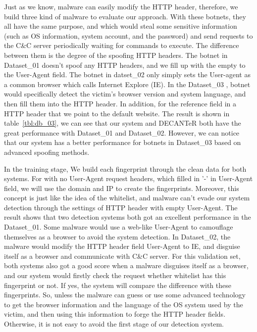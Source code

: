 Just as we know, malware can easily modify the HTTP header, therefore, we build three kind of malware to evaluate our approach. With these botnets, they all have the same purpose, and which would steal some sensitive information (such as OS information, system account, and the password) and send requests to the C\&C server periodically waiting for commands to execute. The difference between them is the degree of the spoofing HTTP headers. The botnet in Dataset\_01 doesn't spoof any HTTP headers, and we fill up with the empty to the User-Agent field. The botnet in datset\_02 only simply sets the User-agent as a common browser which calls Internet Explore (IE). In the Dataset\_03 , botnet would specifically detect the victim's browser version and system language, and then fill them into the HTTP header. In addition, for the reference field in a HTTP header that we point to the default website. The result is shown in table~\ref{tbl:db_03}, we can see that our system and DECANTeR \cite{bortolameotti2017decanter} both have the great performance with Dataset\_01 and Dataset\_02. However, we can notice that our system has a better performance for botnets in Dataset\_03 based on advanced spoofing methods.

In the training stage, We build each fingerprint through the clean data for both systems. For with no User-Agent request headers, which filled in '-' in User-Agent field, we will use the domain and IP to create the fingerprints. Moreover, this concept is just like the idea of the whitelist, and malware can't evade our system detection through the settings of HTTP header with empty User-Agent. The result shows that two detection systems both got an excellent performance in the Dataset\_01. Some malware would use a web-like User-Agent to camouflage themselves as a browser to avoid the system detection. In Dataset\_02, the malware would modify the HTTP header field User-Agent to IE, and disguise itself as a browser and communicate with C\&C server. For this validation set, both systems also got a good score when a malware disguises itself as a browser, and our system would firstly check the request whether whitelist has this fingerprint or not. If yes, the system will compare the difference with these fingerprints. So, unless the malware can guess or use some advanced technology to get the browser information and the language of the OS system used by the victim, and then using this information to forge the HTTP header fields. Otherwise, it is not easy to avoid the first stage of our detection system.

